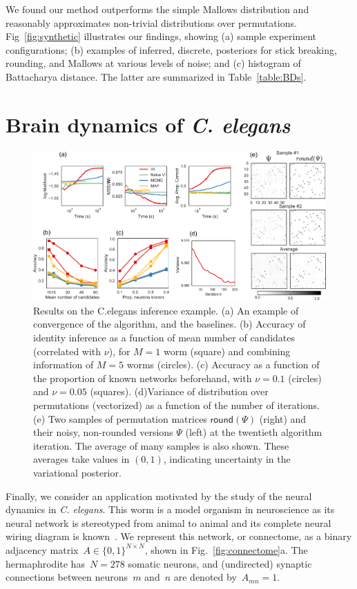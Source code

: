 \documentclass[twoside]{article}
\begin{document}
We found our method outperforms the simple Mallows distribution and
reasonably approximates non-trivial distributions over
permutations. Fig~\ref{fig:synthetic} illustrates our findings,
showing (a) sample experiment configurations; (b) examples of
inferred, discrete, posteriors for stick breaking, rounding, and
Mallows at various levels of noise; and (c) histogram of Battacharya
distance.  The latter are summarized in Table~\ref{table:BDs}.


\section{Brain dynamics of \textit{C. elegans}}
\label{sec:celegans}

\begin{figure}[ht]
  \centering
  \includegraphics[width=6in]{figure7.pdf} 
  \caption{Results on the C.elegans inference example. (a) An example
    of convergence of the algorithm, and the baselines. (b) Accuracy
    of identity inference as a function of mean number of candidates
    (correlated with $\nu$), for $M=1$ worm (square) and combining
    information of $M=5$ worms (circles). (c) Accuracy as a function
    of the proportion of known networks beforehand, with $\nu=0.1$
    (circles) and $\nu=0.05$ (squares). (d)Variance of distribution
    over permutations (vectorized) as a function of the number of
    iterations. (e) Two samples of permutation matrices
    $\mathsf{round}(\Psi)$ (right) and their noisy, non-rounded
    versions $\Psi$ (left) at the twentieth algorithm iteration. The
    average of many samples is also shown. These averages take values in $(0,1)$, 
    indicating uncertainty in the variational posterior.}
\label{fig:elegantresults}
\end{figure}


Finally, we consider an application motivated by the study of the
neural dynamics in \textit{C. elegans}. This worm is a model organism
in neuroscience as its neural network is stereotyped from animal to
animal and its complete neural wiring diagram is
known~\citep{varshney2011structural}.  We represent this network, or
connectome, as a binary adjacency
matrix~${A \in \{0,1\}^{N \times N}}$, shown in
Fig.~\ref{fig:connectome}a. The hermaphrodite has~${N=278}$ somatic
neurons, and (undirected) synaptic connections between neurons~$m$
and~$n$ are denoted by~$A_{mn}=1$.
\end{document}
